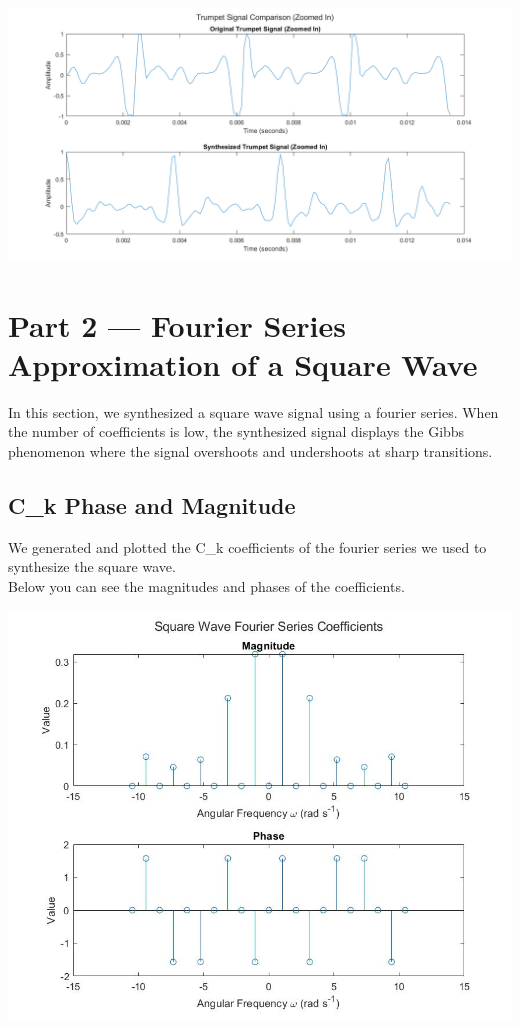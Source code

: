 \documentclass[11pt]{article}
\begin{document}
\includegraphics[width=\textwidth]{trumpet_signal_comparison_(zoomed in).png}


\begin{framed}
	
\end{framed}


\pagebreak
\section{Part 2 --- Fourier Series Approximation of a Square Wave}

In this section, we synthesized a square wave signal using a fourier series.
When the number of coefficients is low, the synthesized signal displays the Gibbs
phenomenon where the signal overshoots and undershoots at sharp transitions.

\subsection{C\_k Phase and Magnitude}

We generated and plotted the C\_k coefficients of the fourier series
we used to synthesize the square wave.\\

Below you can see the magnitudes and phases of the coefficients.

\includegraphics[width=\textwidth]{ck_values.png}
\end{document}
